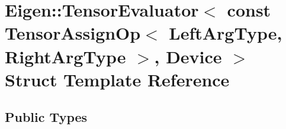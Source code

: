 \hypertarget{struct_eigen_1_1_tensor_evaluator_3_01const_01_tensor_assign_op_3_01_left_arg_type_00_01_right_arg_type_01_4_00_01_device_01_4}{}\section{Eigen\+:\+:Tensor\+Evaluator$<$ const Tensor\+Assign\+Op$<$ Left\+Arg\+Type, Right\+Arg\+Type $>$, Device $>$ Struct Template Reference}
\label{struct_eigen_1_1_tensor_evaluator_3_01const_01_tensor_assign_op_3_01_left_arg_type_00_01_right_arg_type_01_4_00_01_device_01_4}
\subsection*{Public Types}
